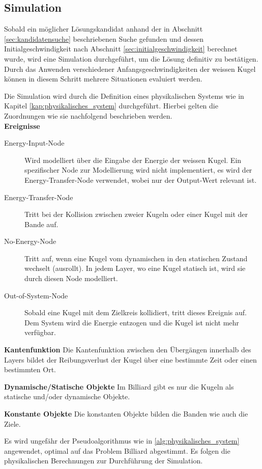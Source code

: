 \subsection{Simulation}
Sobald ein möglicher Lösungskandidat anhand der in Abschnitt \ref{sec:kandidatensuche} beschriebenen Suche gefunden
und dessen Initialgeschwindigkeit nach Abschnitt \ref{sec:initialgeschwindigkeit} berechnet wurde,
wird eine Simulation durchgeführt, um die Lösung definitiv zu bestätigen.
Durch das Anwenden verschiedener Anfangsgeschwindigkeiten der weissen Kugel können in diesem Schritt mehrere Situationen evaluiert werden.

Die Simulation wird durch die Definition eines physikalischen Systems wie in Kapitel \ref{kap:physikalisches_system} durchgeführt.
Hierbei gelten die Zuordnungen wie sie nachfolgend beschrieben werden.\\
\textbf{Ereignisse}
\begin{description}
    \item[Energy-Input-Node] Wird modelliert über die Eingabe der Energie der weissen Kugel. Ein spezifischer Node zur
    Modellierung wird nicht implementiert, es wird der Energy-Transfer-Node verwendet, wobei nur der Output-Wert relevant ist.
    \item[Energy-Transfer-Node] Tritt bei der Kollision zwischen zweier Kugeln oder einer Kugel mit der Bande auf.
    \item[No-Energy-Node] Tritt auf, wenn eine Kugel vom dynamischen in den statischen Zustand wechselt (ausrollt). In jedem
    Layer, wo eine Kugel statisch ist, wird sie durch diesen Node modelliert.
    \item[Out-of-System-Node] Sobald eine Kugel mit dem Zielkreis kollidiert, tritt dieses Ereignis auf. Dem System wird die
    Energie entzogen und die Kugel ist nicht mehr verfügbar.
\end{description}

\textbf{Kantenfunktion}
Die Kantenfunktion zwischen den Übergängen innerhalb des Layers bildet der Reibungsverlust der
Kugel über eine bestimmte Zeit oder einen bestimmten Ort.

\textbf{Dynamische/Statische Objekte}
Im Billiard gibt es nur die Kugeln als statische und/oder dynamische Objekte.

\textbf{Konstante Objekte}
Die konstanten Objekte bilden die Banden wie auch die Ziele.

Es wird ungefähr der Pseudoalgorithmus wie in \ref{alg:physikalisches_system} angewendet, optimal auf das Problem \glqq{} Billiard\grqq{}
abgestimmt. Es folgen die physikalischen Berechnungen zur Durchführung der Simulation.


